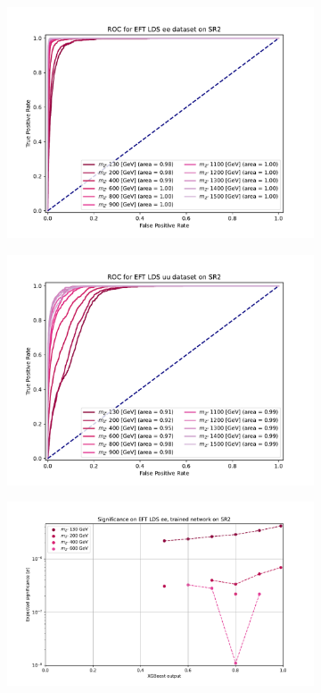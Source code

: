 \documentclass[12pt, a4paper]{book}
\begin{document}
\begin{figure}[!ht]
\begin{subfigure}[b]{0.49\textwidth}
      \includegraphics[width=1\textwidth]{XGBoost/Model_independent/100-150/EFT_LDS/ROC_ee.pdf}
   \end{subfigure}
   \hfill
   \begin{subfigure}[b]{0.49\textwidth}
      \centering
      \includegraphics[width=1\textwidth]{XGBoost/Model_independent/100-150/EFT_LDS/ROC_uu.pdf}
   \end{subfigure}
   \hfill
	\begin{subfigure}[b]{0.49\textwidth}
      \centering
      \includegraphics[width=1\textwidth]{XGBoost/Model_independent/100-150/EFT_LDS/EXP_SIG_ee.pdf}

\end{subfigure}
\end{figure}
\end{document}
